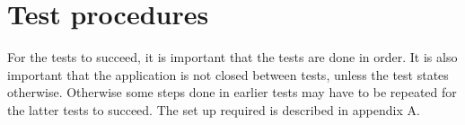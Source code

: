 \chapter{Test procedures}
\label{chap:testProcedures}
For the tests to succeed, it is important that the tests are done in order. It is also important that the application is not closed between tests, unless the test states otherwise. Otherwise some steps done in earlier tests may have to be repeated for the latter tests to succeed. The set up required is described in appendix A.